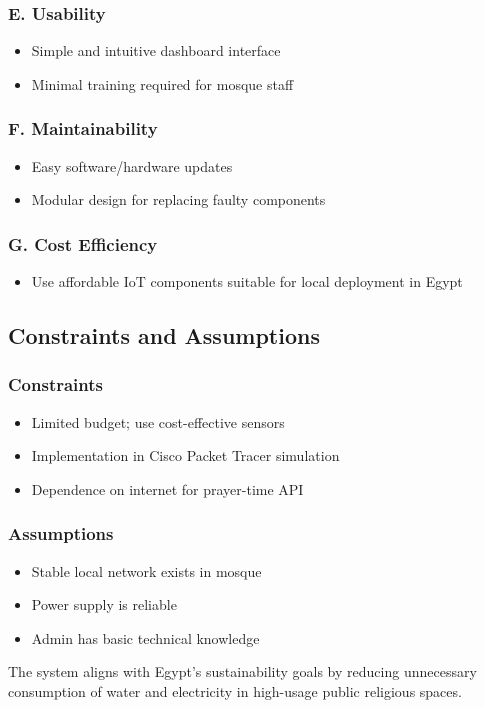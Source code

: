 \subsubsection*{E. Usability}
\begin{itemize}
  \item Simple and intuitive dashboard interface
  \item Minimal training required for mosque staff
\end{itemize}

\subsubsection*{F. Maintainability}
\begin{itemize}
  \item Easy software/hardware updates
  \item Modular design for replacing faulty components
\end{itemize}

\subsubsection*{G. Cost Efficiency}
\begin{itemize}
  \item Use affordable IoT components suitable for local deployment in Egypt
\end{itemize}

\subsection{Constraints and Assumptions}
\subsubsection*{Constraints}
\begin{itemize}
  \item Limited budget; use cost-effective sensors
  \item Implementation in Cisco Packet Tracer simulation
  \item Dependence on internet for prayer-time API
\end{itemize}

\subsubsection*{Assumptions}
\begin{itemize}
  \item Stable local network exists in mosque
  \item Power supply is reliable
  \item Admin has basic technical knowledge
\end{itemize}

The system aligns with Egypt's sustainability goals by reducing unnecessary consumption of water and electricity in high-usage public religious spaces.
